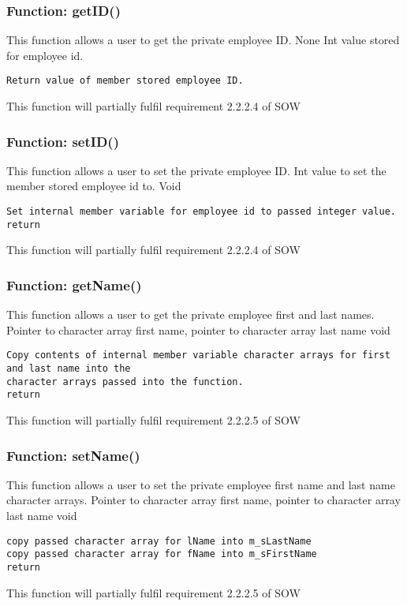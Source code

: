 \documentclass[12pt]{article}%
\newcounter{subsubsubsection}[subsubsection]
\begin{document}
\subsubsection{Function:  getID()}
This function allows a user to get the private employee ID.
None
Int value stored for employee id.
\begin{verbatim}
Return value of member stored employee ID.
\end{verbatim}
This function will partially fulfil requirement 2.2.2.4 of SOW

\subsubsection{Function:  setID()}
This function allows a user to set the private employee ID.
Int value to set the member stored employee id to.
Void
\begin{verbatim}
Set internal member variable for employee id to passed integer value.
return
\end{verbatim}
This function will partially fulfil requirement 2.2.2.4 of SOW


\subsubsection{Function:  getName()}
This function allows a user to get the private employee first and last names.
Pointer to character array first name, pointer to character array last name
void
\begin{verbatim}
Copy contents of internal member variable character arrays for first and last name into the
character arrays passed into the function.
return
\end{verbatim}
This function will partially fulfil requirement 2.2.2.5 of SOW


\subsubsection{Function:  setName()}
This function allows a user to set the private employee first name and last name character arrays.
Pointer to character array first name, pointer to character array last name
void
\begin{verbatim}
copy passed character array for lName into m_sLastName
copy passed character array for fName into m_sFirstName
return
\end{verbatim}
This function will partially fulfil requirement 2.2.2.5 of SOW
\end{document}
